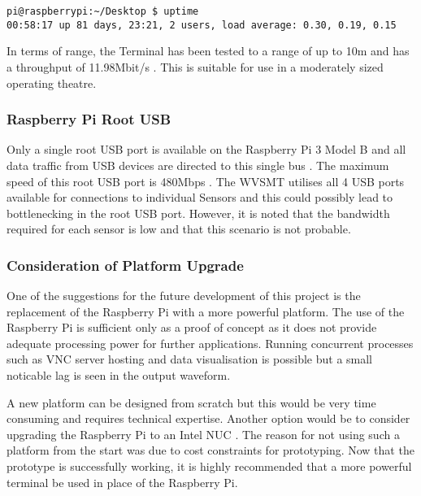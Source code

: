 \begin{lstlisting}
pi@raspberrypi:~/Desktop $ uptime
00:58:17 up 81 days, 23:21, 2 users, load average: 0.30, 0.19, 0.15
\end{lstlisting}

In terms of range, the Terminal has been tested to a range of up to 10m and has a throughput of 11.98Mbit/s \cite{wifibenchmark}. This is suitable for use in a moderately sized operating theatre. 

\subsubsection{Raspberry Pi Root USB}

Only a single root USB port is available on the Raspberry Pi 3 Model B and all data traffic from USB devices are directed to this single bus \cite{rpi3hardware}. The maximum speed of this root USB port is 480Mbps \cite{rpi3faqs}. The WVSMT utilises all 4 USB ports available for connections to individual Sensors and this could possibly lead to bottlenecking in the root USB port. However, it is noted that the bandwidth required for each sensor is low and that this scenario is not probable. 

\subsubsection{Consideration of Platform Upgrade}

One of the suggestions for the future development of this project is the replacement of the Raspberry Pi with a more powerful platform. The use of the Raspberry Pi is sufficient only as a proof of concept as it does not provide adequate processing power for further applications. Running concurrent processes such as VNC server hosting and data visualisation is possible but a small noticable lag is seen in the output waveform.   

A new platform can be designed from scratch but this would be very time consuming and requires technical expertise. Another option would be to consider upgrading the Raspberry Pi to an Intel NUC \cite{intelnuc}. The reason for not using such a platform from the start was due to cost constraints for prototyping. Now that the prototype is successfully working, it is highly recommended that a more powerful terminal be used in place of the Raspberry Pi.  